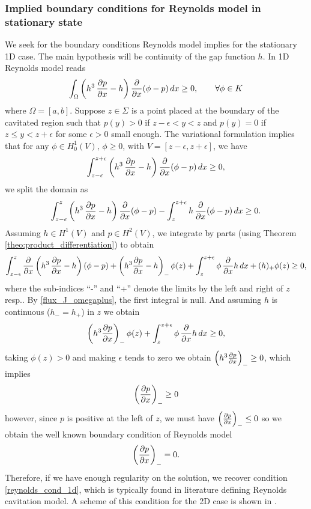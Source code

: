 \subsubsection*{Implied boundary conditions for Reynolds model in stationary state}
We seek for the boundary conditions Reynolds model implies for the stationary 1D case. The main hypothesis will be continuity of the gap function $h$. In 1D Reynolds model reads
\begin{align*}
\int_\Omega \left(h^3\,\frac{\partial  p}{\partial x}-h\right) \frac{\partial }{\partial x}(\phi-p)\,dx\geq 0,\qquad\forall \phi \in K
\end{align*}
where $\Omega=[a,b]$. Suppose $z\in \Sigma$ is a point placed at the boundary of the cavitated region such that $p(y)>0$ if $z-\epsilon < y < z$ and $p(y)=0$ if $z\leq y < z+\epsilon$ for some $\epsilon>0$ small enough. The variational formulation implies that for any $\phi \in H^1_0(V),\,\phi\geq 0$, with $V=[z-\epsilon,z+\epsilon]$, we have
\begin{align*}
\int_{z-\epsilon}^{z+\epsilon}\left(h^3\,\frac{\partial  p}{\partial x}-h\right) \frac{\partial }{\partial x}(\phi-p)\,dx\geq 0,
\end{align*}
we split the domain as
\begin{align*}
\int_{z-\epsilon}^{z}\left(h^3\,\frac{\partial  p}{\partial x}-h\right) \frac{\partial }{\partial x}(\phi-p)-\int_{z	}^{z+\epsilon}h\, \frac{\partial }{\partial x}(\phi-p)\,dx\geq 0.
\end{align*}
Assuming $h\in H^1(V)$ and $p\in H^2(V)$, we integrate by parts (using Theorem \ref{theo:product_differentiation}) to obtain
\begin{align*}
\int_{z-\epsilon}^{z}\frac{\partial }{\partial x}\left(h^3\,\frac{\partial  p}{\partial x}-h\right) (\phi-p)+\left(h^3\frac{\partial p}{\partial x}-h\right)_-\phi(z)+\int_{z	}^{z+\epsilon}\phi\,\frac{\partial }{\partial x}h\,dx+(h)_+\phi(z)\geq 0,
\end{align*}
where the sub-indices ``-'' and ``+'' denote the limits by the left and right of $z$ resp.. By \eqref{flux_J_omegaplus}, the first integral is null. And assuming $h$ is continuous ($h_-=h_+$) in $z$ we obtain
\begin{align*}
\left(h^3\frac{\partial p}{\partial x}\right)_-\phi(z)+\int_{z	}^{z+\epsilon}\phi\,\frac{\partial }{\partial x}h \,dx\geq 0,
\end{align*}
taking $\phi(z)>0$ and making $\epsilon$ tends to zero we obtain $\left(h^3\frac{\partial p}{\partial x}\right)_-\geq 0$, which implies
$$\left(\frac{\partial p}{\partial x}\right)_-\geq 0$$
however, since $p$ is positive at the left of $z$, we must have $\left(\frac{\partial p}{\partial x}\right)_-\leq 0$ so we obtain the well known boundary condition of Reynolds model
$$\left(\frac{\partial p}{\partial x}\right)_-= 0.$$
Therefore, if we have enough regularity on the solution, we recover condition \eqref{reynolds_cond_1d}, which is typically found in literature defining Reynolds cavitation model. A scheme of this condition for the 2D case is shown in .

